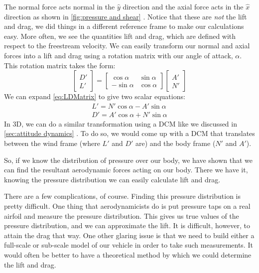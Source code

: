 \documentclass[10pt, openany, titlepage]{book}
\theoremstyle{definition}
\let\oldautoref\autoref
\renewcommand{\autoref}[1]{%
  \begingroup
  \hypersetup{linkcolor=black}%
  \oldautoref{#1}%
  \endgroup
}
\begin{document}
The normal force acts normal in the $\hat{y}$ direction and the axial force acts in the $\hat {x}$ direction as shown in \autoref{fig:pressure and shear}. Notice that these are \textit{not} the lift and drag, we did things in a different reference frame to make our calculations easy. More often, we see the quantities lift and drag, which are defined with respect to the \gls{freestream} velocity. We can easily transform our normal and axial forces into a lift and drag using a rotation matrix with our \gls{angle of attack}, $\alpha$. This rotation matrix takes the form:
\begin{equation}\label{eq:LDMatrix}
 \begin{bmatrix}
     D'\\L'
 \end{bmatrix}
 =\begin{bmatrix}
        \cos\alpha &\sin\alpha\\
        -\sin\alpha&\cos\alpha
    \end{bmatrix}
    \begin{bmatrix}
        A'\\N'
    \end{bmatrix}
\end{equation}
We can expand \eqref{eq:LDMatrix} to give two scalar equations:
\begin{gather}
        L'=N'\cos\alpha-A'\sin\alpha\\
        D'=A'\cos\alpha+N'\sin\alpha
\end{gather}
In 3D, we can do a similar transformation using a DCM like we discussed in \autoref{sec:attitude dynamics}. To do so, we would come up with a DCM that translates between the wind frame (where $L'$ and $D'$ are) and the body frame ($N'$ and $A'$).

So, if we know the distribution of pressure over our body, we have shown that we can find the resultant aerodynamic forces acting on our body. There we have it, knowing the pressure distribution we can easily calculate lift and drag.

There are a few complications, of course. Finding this pressure distribution is pretty difficult. One thing that aerodynamicists do is put pressure taps on a real airfoil and measure the pressure distribution. This gives us true values of the pressure distribution, and we can approximate the lift. It is difficult, however, to attain the drag that way. One other glaring issue is that we need to build either a full-scale or sub-scale model of our vehicle in order to take such measurements. It would often be better to have a theoretical method by which we could determine the lift and drag.
\end{document}
